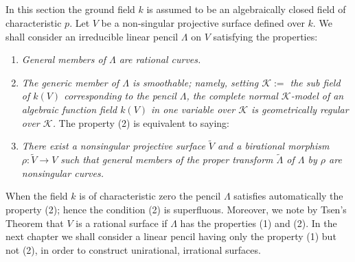 \subsection{}\label{chap2:2.1}
In this section the ground field $k$ is assumed to be an algebraically
closed field of characteristic $p$. Let $V$ be a non-singular
projective surface defined over $k$. We shall consider an irreducible
linear pencil $\Lambda$ on $V$ satisfying the properties:
\begin{enumerate}
\renewcommand{\labelenumi}{\rm(\theenumi)}
\item {\em General members of $\Lambda$ are rational curves.}

\item {\em The generic member of $\Lambda$ is smoothable; namely,
  setting $\mathscr{K}:=$ the sub field of $k(V)$ corresponding to the
  pencil $\Lambda$, the complete normal $\mathscr{K}$-model of an
  algebraic function field $k(V)$ in one variable over $\mathscr{K}$
  is geometrically regular over $\mathscr{K}$.} The property (2) is
  equivalent to saying:

\renewcommand{\labelenumi}{\rm(\theenumi$'$)}
\setcounter{enumi}{1}
\item {\em There exist a nonsingular projective surface
  $\widetilde{V}$ and a birational morphism $\rho:\widetilde{V}\to V$
  such that general members of the proper transform
  $\widetilde{\Lambda}$ of $\Lambda$ by $\rho$ are nonsingular curves.}
\end{enumerate}
When the field $k$ is of characteristic zero the pencil $\Lambda$
satisfies automatically the property (2); hence the condition (2) is
superfluous. Moreover, we note by Tsen's Theorem that $V$ is a
rational surface if $\Lambda$ has the properties (1) and (2). In the
next chapter we shall consider a linear pencil having only the
property (1) but not (2), in order to construct unirational,
irrational surfaces.

